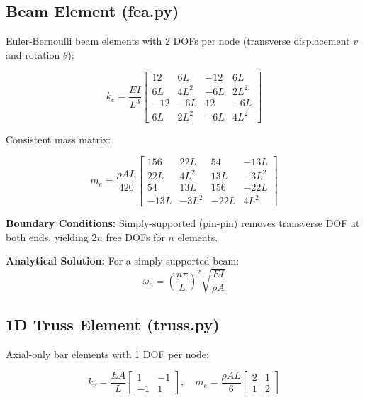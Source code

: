 \documentclass[12pt, a4paper]{article}
\begin{document}
\subsection{Beam Element (fea.py)}

Euler-Bernoulli beam elements with 2 DOFs per node (transverse displacement $v$ and rotation $\theta$):

\begin{equation}
k_e = \frac{EI}{L^3}
\begin{bmatrix}
12 & 6L & -12 & 6L \\
6L & 4L^2 & -6L & 2L^2 \\
-12 & -6L & 12 & -6L \\
6L & 2L^2 & -6L & 4L^2
\end{bmatrix}
\end{equation}

Consistent mass matrix:

\begin{equation}
m_e = \frac{\rho A L}{420}
\begin{bmatrix}
156 & 22L & 54 & -13L \\
22L & 4L^2 & 13L & -3L^2 \\
54 & 13L & 156 & -22L \\
-13L & -3L^2 & -22L & 4L^2
\end{bmatrix}
\end{equation}

\textbf{Boundary Conditions:} Simply-supported (pin-pin) removes transverse DOF at both ends, yielding $2n$ free DOFs for $n$ elements.

\textbf{Analytical Solution:} For a simply-supported beam:
\begin{equation}
    \omega_n = \left(\frac{n\pi}{L}\right)^2 \sqrt{\frac{EI}{\rho A}}
\end{equation}

\subsection{1D Truss Element (truss.py)}

Axial-only bar elements with 1 DOF per node:

\begin{equation}
k_e = \frac{EA}{L}
\begin{bmatrix}
1 & -1 \\ -1 & 1
\end{bmatrix}, \quad
m_e = \frac{\rho A L}{6}
\begin{bmatrix}
2 & 1 \\ 1 & 2
\end{bmatrix}
\end{equation}
\end{document}
